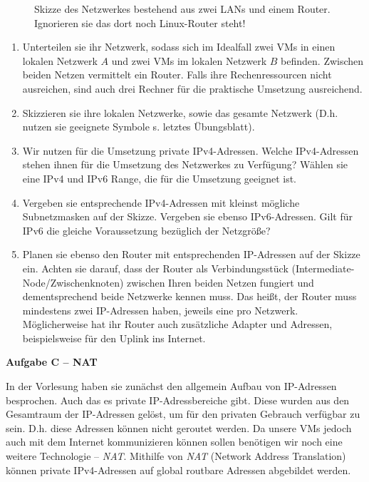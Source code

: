 \documentclass[paper=a4,fontsize=11pt]{scrartcl}%
\numberwithin{equation}{section}
\begin{document}
\begin{enumerate}
\begin{figure}[h]
	\caption{Skizze des Netzwerkes bestehend aus zwei LANs und einem Router. Ignorieren sie das dort noch Linux-Router steht!}
	\end{figure}
	\begin{enumerate}
		\item Unterteilen sie ihr Netzwerk, sodass sich im Idealfall zwei VMs in einen lokalen Netzwerk $A$ und zwei VMs im lokalen Netzwerk $B$ befinden. Zwischen beiden Netzen vermittelt ein Router. Falls ihre Rechenressourcen nicht ausreichen, sind auch drei Rechner für die praktische Umsetzung ausreichend.
		\item Skizzieren sie ihre lokalen Netzwerke, sowie das gesamte Netzwerk (D.h. nutzen sie geeignete Symbole s. letztes Übungsblatt).
		\item Wir nutzen für die Umsetzung private IPv4-Adressen. Welche IPv4-Adressen stehen ihnen für die Umsetzung des Netzwerkes zu Verfügung? Wählen sie eine IPv4 und IPv6 Range, die für die Umsetzung geeignet ist.
		\item Vergeben sie entsprechende IPv4-Adressen mit kleinst mögliche Subnetzmasken auf der Skizze. Vergeben sie ebenso IPv6-Adressen. Gilt für IPv6 die gleiche Voraussetzung bezüglich der Netzgröße?
		\item Planen sie ebenso den Router mit entsprechenden IP-Adressen auf der Skizze ein. Achten sie darauf, dass der Router als Verbindungsstück (Intermediate-Node/Zwischenknoten) zwischen Ihren beiden Netzen fungiert und dementsprechend beide Netzwerke kennen muss. Das heißt, der Router muss mindestens zwei IP-Adressen haben, jeweils eine pro Netzwerk. Möglicherweise hat ihr Router auch zusätzliche Adapter und Adressen, beispielsweise für den Uplink ins Internet.
	\end{enumerate}
\end{enumerate}

\begin{center}
\Large{\textbf{Aufgabe C -- NAT}}
\end{center}
\vskip0.25in

In der Vorlesung haben sie zunächst den allgemein Aufbau von IP-Adressen besprochen. Auch das es private IP-Adressbereiche gibt. Diese wurden aus den Gesamtraum der IP-Adressen gelöst, um für den privaten Gebrauch verfügbar zu sein. D.h. diese Adressen können nicht geroutet werden. Da unsere VMs jedoch auch mit dem Internet kommunizieren können sollen benötigen wir noch eine weitere Technologie -- \emph{NAT}. Mithilfe von \emph{NAT} (Network Address Translation) können private IPv4-Adressen auf global routbare Adressen abgebildet werden.
\end{document}
